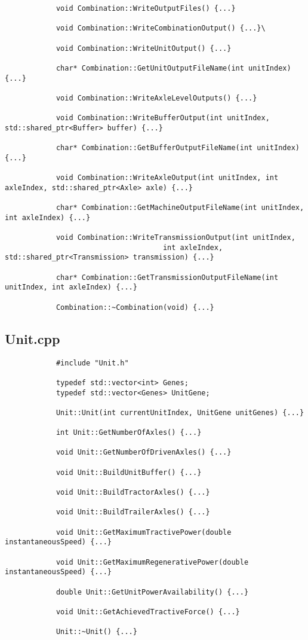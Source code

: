\documentclass[ExampleMasters.tex]{subfiles}
\begin{document}
\begin{verbatim}
			void Combination::WriteOutputFiles() {...}

			void Combination::WriteCombinationOutput() {...}\

			void Combination::WriteUnitOutput() {...}

			char* Combination::GetUnitOutputFileName(int unitIndex) {...}

			void Combination::WriteAxleLevelOutputs() {...}

			void Combination::WriteBufferOutput(int unitIndex, std::shared_ptr<Buffer> buffer) {...}

			char* Combination::GetBufferOutputFileName(int unitIndex) {...}

			void Combination::WriteAxleOutput(int unitIndex, int axleIndex, std::shared_ptr<Axle> axle) {...}

			char* Combination::GetMachineOutputFileName(int unitIndex, int axleIndex) {...}

			void Combination::WriteTransmissionOutput(int unitIndex,
									 int axleIndex, std::shared_ptr<Transmission> transmission) {...}

			char* Combination::GetTransmissionOutputFileName(int unitIndex, int axleIndex) {...}

			Combination::~Combination(void) {...}
			\end{verbatim}

		\subsection{Unit.cpp} \label{sec:appendixunit}
			\begin{verbatim}
			#include "Unit.h"

			typedef std::vector<int> Genes;
			typedef std::vector<Genes> UnitGene;

			Unit::Unit(int currentUnitIndex, UnitGene unitGenes) {...}

			int Unit::GetNumberOfAxles() {...}

			void Unit::GetNumberOfDrivenAxles() {...}

			void Unit::BuildUnitBuffer() {...}

			void Unit::BuildTractorAxles() {...}

			void Unit::BuildTrailerAxles() {...}

			void Unit::GetMaximumTractivePower(double instantaneousSpeed) {...}

			void Unit::GetMaximumRegenerativePower(double instantaneousSpeed) {...}

			double Unit::GetUnitPowerAvailability() {...}

			void Unit::GetAchievedTractiveForce() {...}

			Unit::~Unit() {...}
			\end{verbatim}
\end{document}
